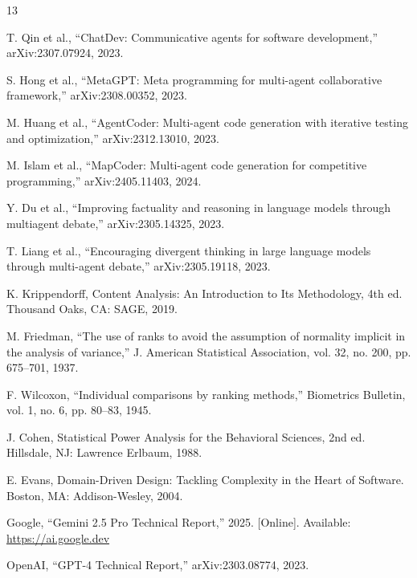 \documentclass[conference]{IEEEtran}
\begin{document}
\begin{thebibliography}{13}

T. Qin et al., ``ChatDev: Communicative agents for software development,'' arXiv:2307.07924, 2023.

S. Hong et al., ``MetaGPT: Meta programming for multi-agent collaborative framework,'' arXiv:2308.00352, 2023.

M. Huang et al., ``AgentCoder: Multi-agent code generation with iterative testing and optimization,'' arXiv:2312.13010, 2023.

M. Islam et al., ``MapCoder: Multi-agent code generation for competitive programming,'' arXiv:2405.11403, 2024.

Y. Du et al., ``Improving factuality and reasoning in language models through multiagent debate,'' arXiv:2305.14325, 2023.

T. Liang et al., ``Encouraging divergent thinking in large language models through multi-agent debate,'' arXiv:2305.19118, 2023.

K. Krippendorff, Content Analysis: An Introduction to Its Methodology, 4th ed. Thousand Oaks, CA: SAGE, 2019.

M. Friedman, ``The use of ranks to avoid the assumption of normality implicit in the analysis of variance,'' J. American Statistical Association, vol. 32, no. 200, pp. 675--701, 1937.

F. Wilcoxon, ``Individual comparisons by ranking methods,'' Biometrics Bulletin, vol. 1, no. 6, pp. 80--83, 1945.

J. Cohen, Statistical Power Analysis for the Behavioral Sciences, 2nd ed. Hillsdale, NJ: Lawrence Erlbaum, 1988.

E. Evans, Domain-Driven Design: Tackling Complexity in the Heart of Software. Boston, MA: Addison-Wesley, 2004.

Google, ``Gemini 2.5 Pro Technical Report,'' 2025. [Online]. Available: \url{https://ai.google.dev}

OpenAI, ``GPT-4 Technical Report,'' arXiv:2303.08774, 2023.

\end{thebibliography}
\end{document}
